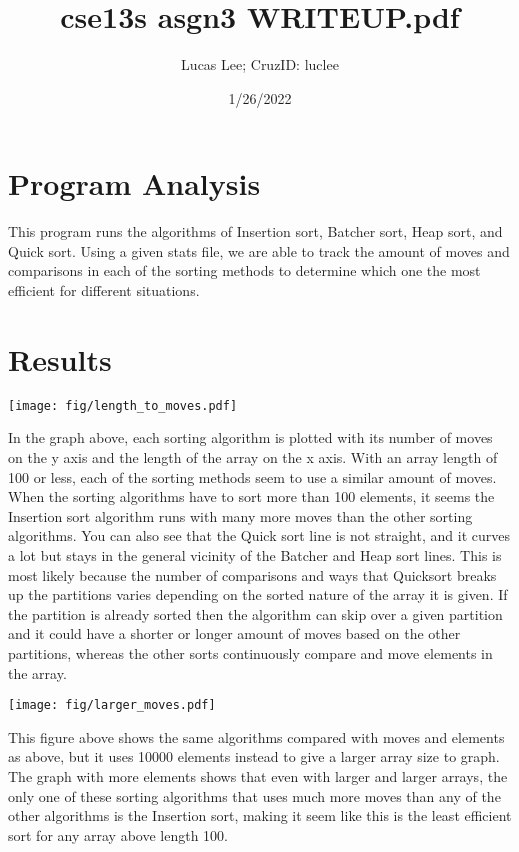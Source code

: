 \documentclass[11pt]{article}
\title{cse13s asgn3 WRITEUP.pdf}
\author{Lucas Lee; CruzID: luclee}
\date{1/26/2022}
\begin{document}
\maketitle

\section{Program Analysis}\label{ss:analysis}
This program runs the algorithms of Insertion sort, Batcher sort, Heap sort, and Quick sort. Using a given stats file, we are able to track the amount of moves and comparisons in each of the sorting methods to determine which one the most efficient for different situations.

\section{Results}\label{ss:results}

\texttt{[image: fig/length\_to\_moves.pdf]}

In the graph above, each sorting algorithm is plotted with its number of moves on the y axis and the length of the array on the x axis. With an array length of 100 or less, each of the sorting methods seem to use a similar amount of moves. When the sorting algorithms have to sort more than 100 elements, it seems the Insertion sort algorithm runs with many more moves than the other sorting algorithms. You can also see that the Quick sort line is not straight, and it curves a lot but stays in the general vicinity of the Batcher and Heap sort lines. This is most likely because the number of comparisons and ways that Quicksort breaks up the partitions varies depending on the sorted nature of the array it is given. If the partition is already sorted then the algorithm can skip over a given partition and it could have a shorter or longer amount of moves based on the other partitions, whereas the other sorts continuously compare and move elements in the array.

\texttt{[image: fig/larger\_moves.pdf]}

This figure above shows the same algorithms compared with moves and elements as above, but it uses 10000 elements instead to give a larger array size to graph. The graph with more elements shows that even with larger and larger arrays, the only one of these sorting algorithms that uses much more moves than any of the other algorithms is the Insertion sort, making it seem like this is the least efficient sort for any array above length 100.
\end{document}

